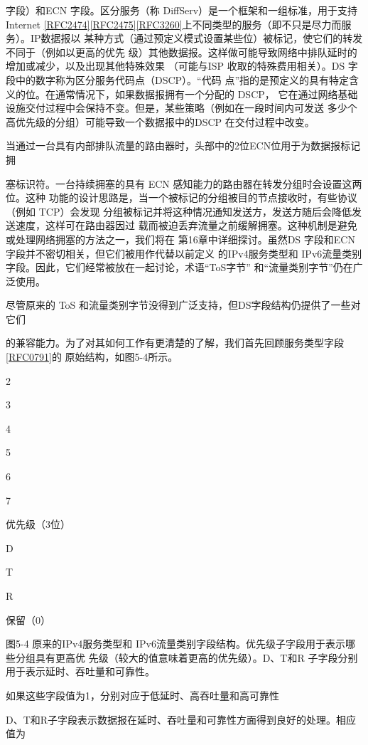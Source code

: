 字段）和ECN 字段。区分服务（称 DiffServ）是一个框架和一组标准，用于支持 Internet
\href{https://www.rfc-editor.org/rfc/rfc2474}{[RFC2474]}\href{https://www.rfc-editor.org/rfc/rfc2475}{[RFC2475]}\href{https://www.rfc-editor.org/rfc/rfc3260}{[RFC3260]}上不同类型的服务（即不只是尽力而服务）。IP数据报以
某种方式（通过预定义模式设置某些位）被标记，使它们的转发不同于（例如以更高的优先
级）其他数据报。这样做可能导致网络中排队延时的增加或减少，以及出现其他特殊效果
（可能与ISP 收取的特殊费用相关）。DS 字段中的数字称为区分服务代码点（DSCP）。“代码
点”指的是预定义的具有特定含义的位。在通常情况下，如果数据报拥有一个分配的 DSCP，
它在通过网络基础设施交付过程中会保持不变。但是，某些策略（例如在一段时间内可发送
多少个高优先级的分组）可能导致一个数据报中的DSCP 在交付过程中改变。

当通过一台具有内部排队流量的路由器时，头部中的2位ECN位用于为数据报标记拥

塞标识符。一台持续拥塞的具有 ECN 感知能力的路由器在转发分组时会设置这两位。这种
功能的设计思路是，当一个被标记的分组被目的节点接收时，有些协议（例如 TCP）会发现
分组被标记并将这种情况通知发送方，发送方随后会降低发送速度，这样可在路由器因过
载而被迫丢弃流量之前缓解拥塞。这种机制是避免或处理网络拥塞的方法之一，我们将在
第16章中详细探讨。虽然DS 字段和ECN 字段并不密切相关，但它们被用作代替以前定义
的IPv4服务类型和 IPv6流量类别字段。因此，它们经常被放在一起讨论，术语“ToS字节”
和“流量类别字节”仍在广泛使用。

尽管原来的 ToS 和流量类别字节没得到广泛支持，但DS字段结构仍提供了一些对它们

的兼容能力。为了对其如何工作有更清楚的了解，我们首先回顾服务类型字段\href{https://www.rfc-editor.org/rfc/rfc0791}{[RFC0791]}的
原始结构，如图5-4所示。

2

3

4

5

6

7

优先级（3位）

D

T

R

保留（0）

图5-4 原来的IPv4服务类型和 IPv6流量类别字段结构。优先级子字段用于表示哪些分组具有更高优
先级（较大的值意味着更高的优先级）。D、T和R 子字段分别用于表示延时、吞吐量和可靠性。

如果这些字段值为1，分别对应于低延时、高吞吐量和高可靠性

D、T和R子字段表示数据报在延时、吞吐量和可靠性方面得到良好的处理。相应值为

